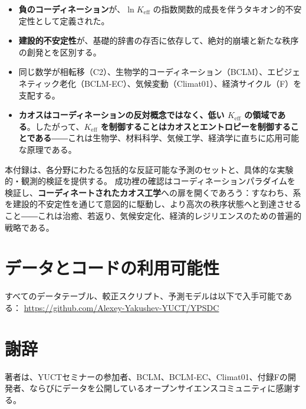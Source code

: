 \documentclass[12pt,a4paper]{article}
\newcommand{\Keff}{K_{\mathrm{eff}}}
\begin{document}
	\begin{itemize}
		\item \textbf{負のコーディネーション}が、\(\ln \Keff\) の指数関数的成長を伴うタキオン的不安定性として定義された。
		\item \textbf{建設的不安定性}が、基礎的辞書の存否に依存して、絶対的崩壊と新たな秩序の創発とを区別する。
		\item 同じ数学が相転移（C2）、生物学的コーディネーション（BCLM）、エピジェネティック老化（BCLM‑EC）、気候変動（Climat01）、経済サイクル（F）を支配する。
		\item \textbf{カオスはコーディネーションの反対概念ではなく、低い \(\Keff\) の領域である}。したがって、\textbf{\(\Keff\) を制御することはカオスとエントロピーを制御することである}――これは生物学、材料科学、気候工学、経済学に直ちに応用可能な原理である。
	\end{itemize}
	
	本付録は、各分野にわたる包括的な反証可能な予測のセットと、具体的な実験的・観測的検証を提供する。
	成功裡の確認はコーディネーションパラダイムを検証し、\textbf{コーディネートされたカオス工学}への扉を開くであろう：すなわち、系を建設的不安定性を通じて意図的に駆動し、より高次の秩序状態へと到達させること――これは治癒、若返り、気候安定化、経済的レジリエンスのための普遍的戦略である。
	
	\section*{データとコードの利用可能性}
	
	すべてのデータテーブル、較正スクリプト、予測モデルは以下で入手可能である：
	\url{https://github.com/Alexey-Yakushev-YUCT/YPSDC}
	
	\section*{謝辞}
	
	著者は、YUCTセミナーの参加者、BCLM、BCLM‑EC、Climat01、付録Fの開発者、ならびにデータを公開しているオープンサイエンスコミュニティに感謝する。
	
\end{document}
